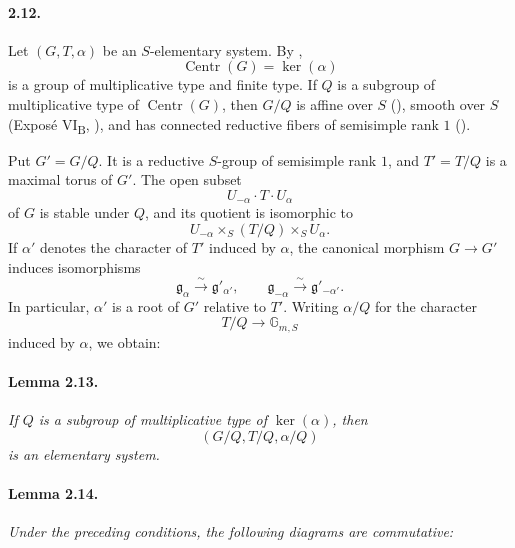 \paragraph{\textbf{2.12.}}
Let \((G,T,\alpha)\) be an \(S\)-elementary system. By ,
\[
  \operatorname{Centr}(G)=\ker(\alpha)
\]
is a group of multiplicative type and finite type. If \(Q\) is a
subgroup of multiplicative type of \(\operatorname{Centr}(G)\),
then \(G/Q\) is affine over \(S\) \textup{()}, smooth
over \(S\) \textup{(Exposé VI\textsubscript{B}, )}, and has
connected reductive fibers of semisimple rank \(1\)
\textup{()}.

Put \(G'=G/Q\). It is a reductive \(S\)-group of semisimple rank
\(1\), and \(T'=T/Q\) is a maximal torus of \(G'\). The open
subset
\[
  U_{-\alpha}\cdot T\cdot U_\alpha
\]
of \(G\) is stable under \(Q\), and its quotient is isomorphic to
\[
  U_{-\alpha}\times_S(T/Q)\times_S U_\alpha.
\]
If \(\alpha'\) denotes the character of \(T'\) induced by
\(\alpha\), the canonical morphism \(G\to G'\) induces
isomorphisms
\[
  \mathfrak g_\alpha\xrightarrow{\sim}\mathfrak g'_{\alpha'},
  \qquad
  \mathfrak g_{-\alpha}\xrightarrow{\sim}\mathfrak g'_{-\alpha'}.
\]
In particular, \(\alpha'\) is a root of \(G'\) relative to \(T'\).
Writing \(\alpha/Q\) for the character
\[
  T/Q\longrightarrow\mathbb G_{m,S}
\]
induced by \(\alpha\), we obtain:

\paragraph{\textbf{Lemma 2.13.}}
\emph{If \(Q\) is a subgroup of multiplicative type of
\(\ker(\alpha)\), then}
\[
  (G/Q,T/Q,\alpha/Q)
\]
\emph{is an elementary system.}



\paragraph{\textbf{Lemma 2.14.}}
\emph{Under the preceding conditions, the following diagrams are
commutative:}

